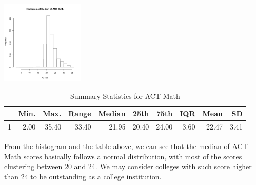 \documentclass{article}\usepackage[]{graphicx}\usepackage[]{color}
\begin{document}
{\centering \includegraphics[width=150px]{../images/histogram-ACTMTMedian} 

}


\begin{table}[ht]
\centering
\begin{tabular}{rrrrrrrrrr}
  \hline
 & Min. & Max. & Range & Median & 25th & 75th & IQR & Mean & SD \\ 
  \hline
1 & 2.00 & 35.40 & 33.40 & 21.95 & 20.40 & 24.00 & 3.60 & 22.47 & 3.41 \\ 
   \hline
\end{tabular}
\caption{Summary Statistics for ACT Math} 
\end{table}


From the histogram and the table above, we can see that the median of ACT Math scores basically follows a normal distribution, with most of the scores clustering between 20 and 24. We may consider colleges with such score higher than 24 to be outstanding as a college institution.
\end{document}
